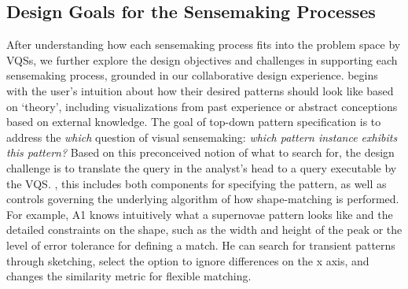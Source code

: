 \subsection{Design Goals for the Sensemaking Processes}
After understanding how each sensemaking process fits into the problem space  by VQSs, we further explore the design objectives and challenges in supporting each sensemaking process, grounded in our collaborative design experience. %
 begins with the user's intuition
about how their desired patterns should look like based on `theory', including visualizations from past experience or abstract conceptions based on external knowledge. The goal of top-down pattern specification is to address the \textit{which} question of visual sensemaking: \textit{which pattern instance exhibits this pattern?} Based on this preconceived notion of what to search for, the design challenge is to translate the query in the
analyst's head to a query executable by the VQS.
,
this includes both components for specifying the pattern,
as well as controls governing the underlying
algorithm of how shape-matching is performed.
For example, A1 knows intuitively
what a supernovae pattern looks like
and the detailed constraints on the shape,
such as the width and height of the peak
or the level of error tolerance for defining a match.
He can search for transient patterns through sketching,
select the option to ignore differences
on the x axis, and changes the similarity metric for flexible matching.  %
